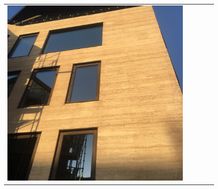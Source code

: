 \begin{figure}[H]
{\begin{tabular}{@{}ccccc@{}}
      \includegraphics[width=\linewidth]{Images/LoRAs/STAMPBETON/Training_images/5.jpg} \\[2pt]


\end{tabular}}
\end{figure}
